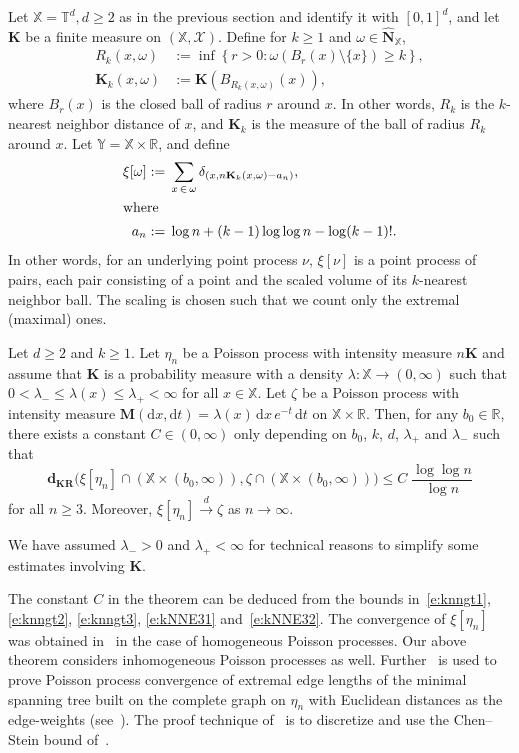 \documentclass[AHL,Unicode,longabstracts]{cedram}
\newcommand*\bM{\mathbf{M}}
\newcommand*\bN{\mathbf{N}}
\newcommand*\bK{\mathbf{K}}
\newcommand*\dkr{\mathbf{d_{KR}}}
\newcommand*\R{\mathbb{R}}
\newcommand*\T{\mathbb{T}}
\newcommand*\X{\mathbb{X}}
\newcommand*\Y{\mathbb{Y}}
\newcommand*\cX{\mathcal{X}}
\newcommand*\md{\mathrm{d}}
\begin{document}
Let $\X = \T^d, d \geq 2$ as in the previous section and identify it with $[0,1]^d$, and let $\bK$ be a finite measure on $(\X,\cX)$. Define for $k\ge 1$ and $\omega \in \widehat{\bN}_{\X}$,
\begin{align*}
R_k(x,\omega) &:= \inf \left\{r > 0 : \omega\left(B_r(x) \setminus \{x\}\right) {\geq} k \right\},\\
\bK_k(x,\omega) &:= \bK\left(B_{R_k(x,\omega)}(x)\right),
\end{align*}
where $B_r(x)$ is the {closed} ball of radius $r$ around $x$. In other words, $R_k$ is the $k$-nearest neighbor distance of $x$, and $\bK_k$ is the measure of the ball of radius $R_k$ around $x$. Let $\Y = \X\times \R$, and define
\begin{align}
\xi[\omega] :=& \;\sum_{x\,\in\,\omega} \delta_{\left(x, n\bK_k(x,\omega) - a_n\right)},\nonumber
\\
\intertext{where}
a_n :=& \;\log n + (k-1)\log \log n - \log (k-1)!.\label{e:a_n}
\end{align}
In other words, {for an underlying point process $\nu$, $\xi[\nu]$} is a point process of pairs, each pair consisting of a point and the scaled volume of its $k$-nearest neighbor ball. The scaling is chosen such that we count only the extremal (maximal) ones.

\begin{theo}\label{t:knnapprox}
Let $d \geq 2$ and $k \geq 1$. Let $\eta_n$ be a Poisson process with intensity measure $n\bK$ and assume that $\bK$ is a probability measure with a density $\lambda : \X \to (0,\infty)$ such that $0 < \lambda_- \le \lambda(x) \le \lambda_+ < \infty$ for all $x\in \X$. Let $\zeta$ be a Poisson process with intensity measure $\bM(\md x,\md t) = \lambda(x) \, \md x \, e^{-t} \, \md t$ on $\X \times \R$. Then, for any $b_0 \in \R$, there exists a constant $C\in(0,\infty)$ only depending on $b_0$, $k$, $d$, $\lambda_+$ and $\lambda_-$ such that
\begin{equation}\label{e:knnbd}
\dkr\big(\xi[\eta_n] \cap \left(\X \times (b_0,\infty)\right),\zeta \cap \left(\X \times (b_0,\infty)\right)\big) \leq C\;\frac{\log \log n}{\log n}
\end{equation}
for all $n\geq 3$. Moreover, $\xi[\eta_n] \stackrel{d}{\to} \zeta$ as $n \to \infty$.
\end{theo}


We have assumed $\lambda_->0$ and $\lambda_+ < \infty$ for technical reasons to simplify some estimates involving $\bK$.

The constant $C$ in the theorem can be deduced from the bounds in~\eqref{e:knngt1}, \eqref{e:knngt2}, \eqref{e:knngt3}, \eqref{e:kNNE31} and~\eqref{e:kNNE32}. The convergence of $\xi[\eta_n]$ was obtained in~\cite[Theorem~2]{Penrose1997} in the case of homogeneous Poisson processes. Our above theorem considers inhomogeneous Poisson processes as well. Further~\cite[Theorem~2]{Penrose1997} is used to prove Poisson process convergence of extremal edge lengths of the minimal spanning tree built on the complete graph on $\eta_n$ with Euclidean distances as the edge-weights (see~\cite[Theorem~3]{Penrose1997}). The proof technique of~\cite[Theorem~2]{Penrose1997} is to discretize and use the Chen--Stein bound of~\cite{Arratia1989}.
\end{document}
